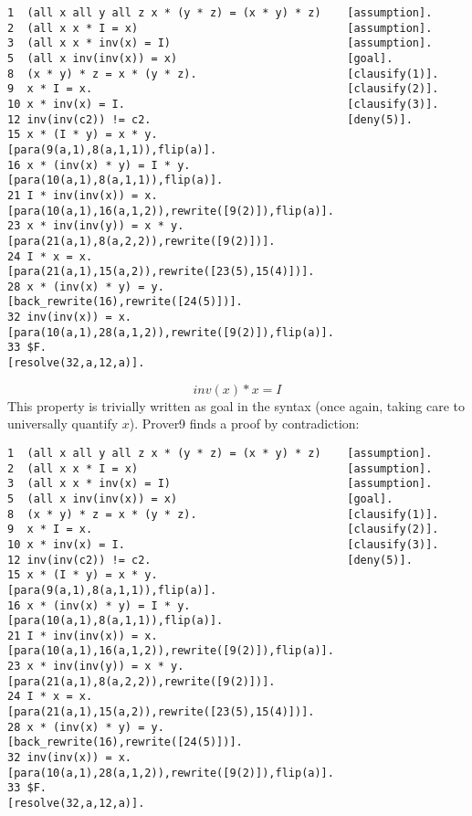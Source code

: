 \documentclass[12pt]{article}
\begin{document}
\begin{lstlisting}
1  (all x all y all z x * (y * z) = (x * y) * z)    [assumption].
2  (all x x * I = x)                                [assumption].
3  (all x x * inv(x) = I)                           [assumption].
5  (all x inv(inv(x)) = x)                          [goal].
8  (x * y) * z = x * (y * z).                       [clausify(1)].
9  x * I = x.                                       [clausify(2)].
10 x * inv(x) = I.                                  [clausify(3)].
12 inv(inv(c2)) != c2.                              [deny(5)].
15 x * (I * y) = x * y.                             [para(9(a,1),8(a,1,1)),flip(a)].
16 x * (inv(x) * y) = I * y.                        [para(10(a,1),8(a,1,1)),flip(a)].
21 I * inv(inv(x)) = x.                             [para(10(a,1),16(a,1,2)),rewrite([9(2)]),flip(a)].
23 x * inv(inv(y)) = x * y.                         [para(21(a,1),8(a,2,2)),rewrite([9(2)])].
24 I * x = x.                                       [para(21(a,1),15(a,2)),rewrite([23(5),15(4)])].
28 x * (inv(x) * y) = y.                            [back_rewrite(16),rewrite([24(5)])].
32 inv(inv(x)) = x.                                 [para(10(a,1),28(a,1,2)),rewrite([9(2)]),flip(a)].
33 $F.                                              [resolve(32,a,12,a)].
\end{lstlisting}

\vspace{3mm}

\begin{equation*}
    inv(x) * x = I
\end{equation*}
This property is trivially written as goal in the syntax (once again, taking 
care to universally quantify $x$). Prover9 finds a proof by contradiction: 

\begin{lstlisting}
1  (all x all y all z x * (y * z) = (x * y) * z)    [assumption].
2  (all x x * I = x)                                [assumption].
3  (all x x * inv(x) = I)                           [assumption].
5  (all x inv(inv(x)) = x)                          [goal].
8  (x * y) * z = x * (y * z).                       [clausify(1)].
9  x * I = x.                                       [clausify(2)].
10 x * inv(x) = I.                                  [clausify(3)].
12 inv(inv(c2)) != c2.                              [deny(5)].
15 x * (I * y) = x * y.                             [para(9(a,1),8(a,1,1)),flip(a)].
16 x * (inv(x) * y) = I * y.                        [para(10(a,1),8(a,1,1)),flip(a)].
21 I * inv(inv(x)) = x.                             [para(10(a,1),16(a,1,2)),rewrite([9(2)]),flip(a)].
23 x * inv(inv(y)) = x * y.                         [para(21(a,1),8(a,2,2)),rewrite([9(2)])].
24 I * x = x.                                       [para(21(a,1),15(a,2)),rewrite([23(5),15(4)])].
28 x * (inv(x) * y) = y.                            [back_rewrite(16),rewrite([24(5)])].
32 inv(inv(x)) = x.                                 [para(10(a,1),28(a,1,2)),rewrite([9(2)]),flip(a)].
33 $F.                                              [resolve(32,a,12,a)].
\end{lstlisting}
\end{document}
